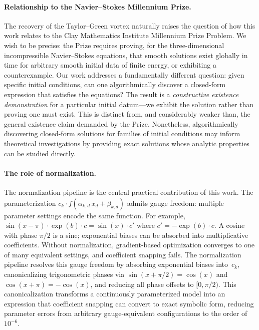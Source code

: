 \paragraph{Relationship to the Navier--Stokes Millennium Prize.}
The recovery of the Taylor--Green vortex naturally raises the question of how
this work relates to the Clay Mathematics Institute Millennium Prize Problem.
We wish to be precise: the Prize requires proving, for the three-dimensional
incompressible Navier--Stokes equations, that smooth solutions exist globally in
time for arbitrary smooth initial data of finite energy, or exhibiting a
counterexample.  Our work addresses a fundamentally different question: given
specific initial conditions, can one algorithmically discover a closed-form
expression that satisfies the equations?  The result is a \emph{constructive
existence demonstration} for a particular initial datum---we exhibit the
solution rather than proving one must exist.  This is distinct from, and
considerably weaker than, the general existence claim demanded by the Prize.
Nonetheless, algorithmically discovering closed-form solutions for families of
initial conditions may inform theoretical investigations by providing exact
solutions whose analytic properties can be studied directly.

\paragraph{The role of normalization.}
The normalization pipeline is the central practical contribution of this work.
The parameterization $c_k \cdot f(\alpha_{k,d}\, x_d + \beta_{k,d})$ admits
gauge freedom: multiple parameter settings encode the same function.  For
example, $\sin(x - \pi) \cdot \exp(b) \cdot c = \sin(x) \cdot c'$ where
$c' = -\exp(b) \cdot c$.  A cosine with phase $\pi/2$ is a sine; exponential
biases can be absorbed into multiplicative coefficients.  Without
normalization, gradient-based optimization converges to one of many equivalent
settings, and coefficient snapping fails.  The normalization pipeline resolves
this gauge freedom by absorbing exponential biases into~$c_k$, canonicalizing
trigonometric phases via $\sin(x + \pi/2) = \cos(x)$ and
$\cos(x + \pi) = -\cos(x)$, and reducing all phase offsets to $[0, \pi/2)$.
This canonicalization transforms a continuously parameterized model into an
expression that coefficient snapping can convert to exact symbolic form,
reducing parameter errors from arbitrary gauge-equivalent configurations to the
order of $10^{-6}$.

